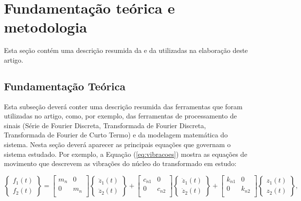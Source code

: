 \section{Fundamentação teórica e metodologia}

Esta seção contém uma descrição resumida da  e da  utilizadas na elaboração deste artigo.

\subsection{Fundamentação Teórica}

Esta subseção deverá conter uma descrição resumida das ferramentas que foram utilizadas no artigo, como, por exemplo, das ferramentas de processamento de sinais (Série de Fourier Discreta, Transformada de Fourier Discreta, Transformada de Fourier de Curto Termo) e da modelagem matemática do sistema.
Nesta seção deverá aparecer as principais equações que governam o sistema estudado.
Por exemplo, a Equação (\ref{eq:vibracoes}) mostra as equações de movimento que descrevem as vibrações do núcleo do transformado em estudo:

\begin{equation}
    \label{eq:vibracoes}
    \begin{Bmatrix}
        f_1(t) \\ f_2(t)
        \end{Bmatrix}
        =
        \begin{bmatrix}
        m_n & 0 \\
        0 & m_n \\
        \end{bmatrix}
        \begin{Bmatrix}
        \ddot{z}_1(t) \\ \ddot{z}_2(t)
        \end{Bmatrix} 
        +
        \begin{bmatrix}
        c_{n1} & 0 \\
        0 & c_{n2} \\
        \end{bmatrix}
        \begin{Bmatrix}
        \dot{z}_1(t) \\ \dot{z}_2(t)
        \end{Bmatrix} 
        +
        \begin{bmatrix}
        k_{n1} & 0 \\
        0 & k_{n2} \\
        \end{bmatrix}
        \begin{Bmatrix}
        z_1(t) \\ z_2(t)
        \end{Bmatrix}
        \text{,}
\end{equation}

